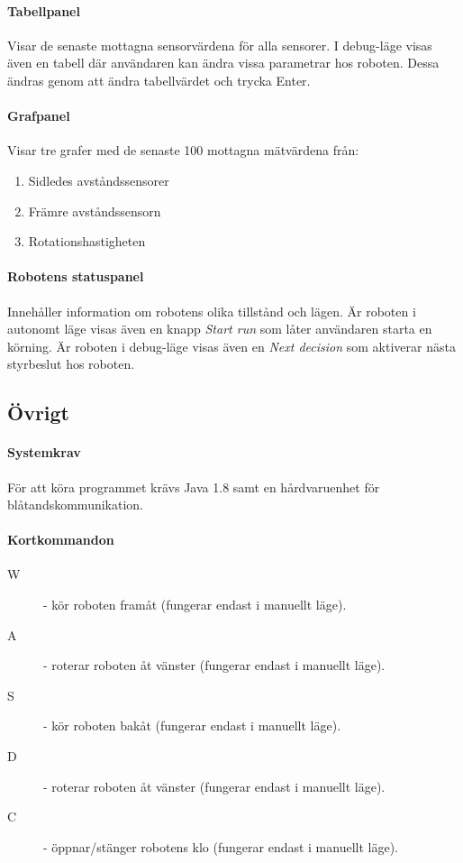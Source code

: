 \documentclass[11pt]{article}
\begin{document}
\paragraph{Tabellpanel} Visar de senaste mottagna sensorvärdena för alla sensorer. I debug-läge visas även en tabell där användaren kan ändra vissa parametrar hos roboten. Dessa ändras genom att ändra tabellvärdet och trycka Enter.

\paragraph{Grafpanel}
Visar tre grafer med  de senaste 100 mottagna mätvärdena från:
\begin{enumerate}
	\item Sidledes avståndssensorer
	\item Främre avståndssensorn
	\item Rotationshastigheten
\end{enumerate}

\paragraph{Robotens statuspanel}
Innehåller information om robotens olika tillstånd och lägen. Är roboten i autonomt läge visas även en knapp \emph{Start run} som låter användaren starta en körning. Är roboten i debug-läge visas även en \emph{Next decision} som aktiverar nästa styrbeslut hos roboten. 

\subsection{Övrigt}
\paragraph{Systemkrav} För att köra programmet krävs Java 1.8 samt en hårdvaruenhet för blåtandskommunikation.
\paragraph{Kortkommandon}\label{kortkommandon}
\begin{description}
	\item[W] - kör roboten framåt (fungerar endast i manuellt läge).
	\item[A] - roterar roboten åt vänster (fungerar endast i manuellt läge).
	\item[S] - kör roboten bakåt (fungerar endast i manuellt läge).
	\item[D] - roterar roboten åt vänster (fungerar endast i manuellt läge).
	\item[C] - öppnar/stänger robotens klo (fungerar endast i manuellt läge).
\end{description}

\end{document}
